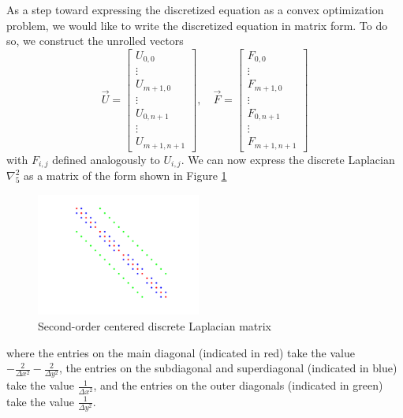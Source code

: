 \documentclass[conference]{IEEEtran}
\begin{document}
As a step toward expressing the discretized equation as a convex optimization problem, we would like to write the discretized equation in matrix form. To do so, we construct the unrolled vectors
\begin{equation}
  \vec{U} = \begin{bmatrix}
    U_{0,0} \\ \vdots \\ U_{m+1,0} \\ \vdots \\ U_{0,n+1} \\ \vdots \\ U_{m+1,n+1}
  \end{bmatrix}, \quad \vec{F} = \begin{bmatrix}
    F_{0,0} \\ \vdots \\ F_{m+1,0} \\ \vdots \\ F_{0,n+1} \\ \vdots \\ F_{m+1,n+1}
  \end{bmatrix}
\end{equation}
with $F_{i,j}$ defined analogously to $U_{i,j}$. We can now express the discrete Laplacian $\nabla_5^2$ as a matrix of the form shown in Figure \ref{fig:discrete-laplacian}
\begin{figure}[t]
  \begin{center}
    \includegraphics[width=0.48\textwidth]{discrete-laplacian}
    \caption{Second-order centered discrete Laplacian matrix}
    \label{fig:discrete-laplacian}
  \end{center}
\end{figure}
where the entries on the main diagonal (indicated in red) take the value $-\frac{2}{\Delta x^2}-\frac{2}{\Delta y^2}$, the entries on the subdiagonal and superdiagonal (indicated in blue) take the value $\frac{1}{\Delta x^2}$, and the entries on the outer diagonals (indicated in green) take the value $\frac{1}{\Delta y^2}$.
\end{document}
